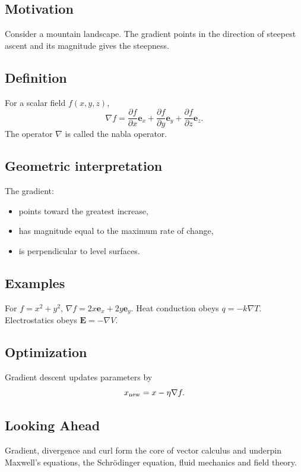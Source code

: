 \subsection{Motivation}
Consider a mountain landscape. The gradient points in the direction of steepest ascent and its magnitude gives the steepness.

\subsection{Definition}
For a scalar field $f(x,y,z)$,
\[
\nabla f=\frac{\partial f}{\partial x}\mathbf e_x+\frac{\partial f}{\partial y}\mathbf e_y+\frac{\partial f}{\partial z}\mathbf e_z.
\]
The operator $\nabla$ is called the nabla operator.

\subsection{Geometric interpretation}
The gradient:
\begin{itemize}
\item points toward the greatest increase,
\item has magnitude equal to the maximum rate of change,
\item is perpendicular to level surfaces.
\end{itemize}

\subsection{Examples}
For $f=x^2+y^2$, $\nabla f=2x\mathbf e_x+2y\mathbf e_y$.
Heat conduction obeys $q=-k\nabla T$.
Electrostatics obeys $\mathbf E=-\nabla V$.

\subsection{Optimization}
Gradient descent updates parameters by
\[
x_{\rm new}=x-\eta\nabla f.
\]

\subsection{Looking Ahead}
Gradient, divergence and curl form the core of vector calculus and underpin Maxwell's equations, the Schr\"odinger equation, fluid mechanics and field theory.
